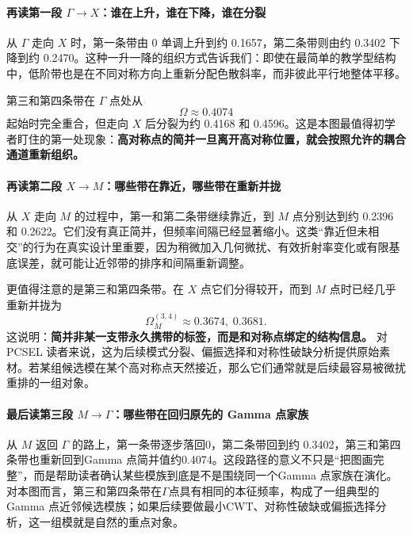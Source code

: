 \paragraph{再读第一段 $\Gamma\rightarrow X$：谁在上升，谁在下降，谁在分裂}
从 $\Gamma$ 走向 $X$ 时，第一条带由 0 单调上升到约 0.1657，第二条带则由约 0.3402 下降到约 0.2470。这种一升一降的组织方式告诉我们：即使在最简单的教学型结构中，低阶带也是在不同对称方向上重新分配色散斜率，而非彼此平行地整体平移。

第三和第四条带在 $\Gamma$ 点处从
\begin{equation}
\Omega \approx 0.4074
\end{equation}
起始时完全重合，但走向 $X$ 后分裂为约 0.4168 和 0.4596。这是本图最值得初学者盯住的第一处现象：\textbf{高对称点的简并一旦离开高对称位置，就会按照允许的耦合通道重新组织。}

\paragraph{再读第二段 $X\rightarrow M$：哪些带在靠近，哪些带在重新并拢}
从 $X$ 走向 $M$ 的过程中，第一和第二条带继续靠近，到 $M$ 点分别达到约 0.2396 和 0.2622。它们没有真正简并，但频率间隔已经显著缩小。这类“靠近但未相交”的行为在真实设计里重要，因为稍微加入几何微扰、有效折射率变化或有限基底误差，就可能让近邻带的排序和间隔重新调整。

更值得注意的是第三和第四条带。在 $X$ 点它们分得较开，而到 $M$ 点时已经几乎重新并拢为
\begin{equation}
\Omega_M^{(3,4)}\approx 0.3674,\;0.3681.
\end{equation}
这说明：\textbf{简并非某一支带永久携带的标签，而是和对称点绑定的结构信息。} 对 PCSEL 读者来说，这为后续模式分裂、偏振选择和对称性破缺分析提供原始素材。若某组候选模在某个高对称点天然接近，那么它们通常就是后续最容易被微扰重排的一组对象。

\paragraph{最后读第三段 $M\rightarrow\Gamma$：哪些带在回归原先的 Gamma 点家族}
从 $M$ 返回 $\Gamma$ 的路上，第一条带逐步落回0，第二条带回到约 0.3402，第三和第四条带也重新回到Gamma 点简并值约0.4074。这段路径的意义不只是“把图画完整”，而是帮助读者确认某些模族到底是不是围绕同一个Gamma 点家族在演化。对本图而言，第三和第四条带在$\Gamma$点具有相同的本征频率，构成了一组典型的Gamma 点近邻候选模族；如果后续要做最小CWT、对称性破缺或偏振选择分析，这一组模就是自然的重点对象。

